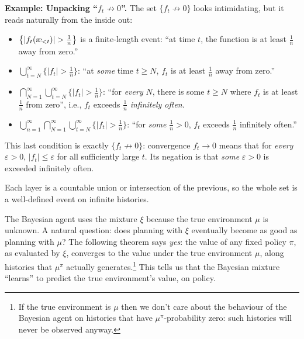 \documentclass[fontsize=11pt, parskip=half]{scrartcl}
\newcommand{\aes}{\textnormal{\ae}}
\begin{document}
\begin{callout}[tip]
\textbf{Example: Unpacking ``$f_t \not\to 0$''.}
The set $\{f_t \not\to 0\}$ looks intimidating, but it reads naturally from the inside out:
\begin{itemize}\itemsep=4pt
    \item $\big\{|f_t(\aes_{<t})| > \tfrac{1}{n}\big\}$ is a finite-length event: ``at time $t$, the function is at least $\tfrac{1}{n}$ away from zero.''

    \item $\bigcup_{t=N}^\infty \big\{|f_t| > \tfrac{1}{n}\big\}$: ``at \emph{some} time $t \geq N$, $f_t$ is at least $\tfrac{1}{n}$ away from zero.''

    \item $\bigcap_{N=1}^\infty \bigcup_{t=N}^\infty \big\{|f_t| > \tfrac{1}{n}\big\}$: ``for \emph{every} $N$, there is some $t \geq N$ where $f_t$ is at least $\tfrac{1}{n}$ from zero'', i.e., $f_t$ exceeds $\tfrac{1}{n}$ \emph{infinitely often}.

    \item $\bigcup_{n=1}^\infty \bigcap_{N=1}^\infty \bigcup_{t=N}^\infty \big\{|f_t| > \tfrac{1}{n}\big\}$: ``for \emph{some} $\tfrac{1}{n} > 0$, $f_t$ exceeds $\tfrac{1}{n}$ infinitely often.''
\end{itemize}
This last condition is exactly $\{f_t \not\to 0\}$: convergence $f_t \to 0$ means that for \emph{every} $\varepsilon > 0$, $|f_t| \leq \varepsilon$ for all sufficiently large $t$. Its negation is that \emph{some} $\varepsilon > 0$ is exceeded infinitely often.

Each layer is a countable union or intersection of the previous, so the whole set is a well-defined event on infinite histories.
\end{callout}


The Bayesian agent uses the mixture $\xi$ because the true environment $\mu$ is unknown.
A natural question: does planning with $\xi$ eventually become as good as planning with $\mu$?
The following theorem says \emph{yes}: the value of any fixed policy $\pi$, as evaluated by $\xi$, converges to the value under the true environment $\mu$, along histories that $\mu^\pi$ actually generates.\footnote{If the true environment is $\mu$ then we don't care about the behaviour of the Bayesian agent on histories that have $\mu^\pi$-probability zero: such histories will never be observed anyway.}
This tells us that the Bayesian mixture ``learns'' to predict the true environment's value, on policy.
\end{document}

